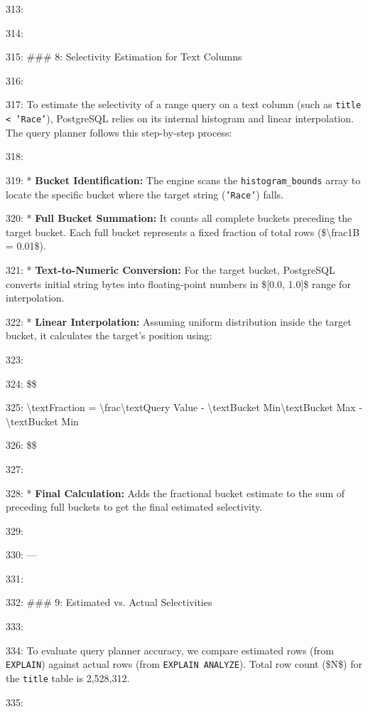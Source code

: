 \documentclass[11pt,a4paper]{article}
\begin{document}
{313:

314:

315: \#\#\# 8: Selectivity Estimation for Text Columns

316:

317: To estimate the selectivity of a range query on a text column (such as \texttt{title < 'Race'}), PostgreSQL relies on its internal histogram and linear interpolation. The query planner follows this step-by-step process:

318:

319: *   \textbf{Bucket Identification:} The engine scans the \texttt{histogram\_bounds} array to locate the specific bucket where the target string (\texttt{'Race'}) falls.

320: *   \textbf{Full Bucket Summation:} It counts all complete buckets preceding the target bucket. Each full bucket represents a fixed fraction of total rows (\$\textbackslash{}frac{1}{B} = 0.01\$).

321: *   \textbf{Text-to-Numeric Conversion:} For the target bucket, PostgreSQL converts initial string bytes into floating-point numbers in \$[0.0, 1.0]\$ range for interpolation.

322: *   \textbf{Linear Interpolation:} Assuming uniform distribution inside the target bucket, it calculates the target's position using:

323:

324:     \$\$

325:     \textbackslash{}text{Fraction} = \textbackslash{}frac{\textbackslash{}text{Query Value} - \textbackslash{}text{Bucket Min}}{\textbackslash{}text{Bucket Max} - \textbackslash{}text{Bucket Min}}

326:     \$\$

327:

328: *   \textbf{Final Calculation:} Adds the fractional bucket estimate to the sum of preceding full buckets to get the final estimated selectivity.

329:

330: ---

331:

332: \#\#\# 9: Estimated vs. Actual Selectivities

333:

334: To evaluate query planner accuracy, we compare estimated rows (from \texttt{EXPLAIN}) against actual rows (from \texttt{EXPLAIN ANALYZE}). Total row count (\$N\$) for the \texttt{title} table is 2,528,312.

335:

}
\end{document}
